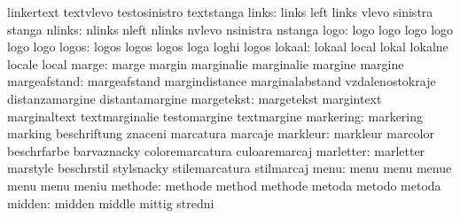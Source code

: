                            linkertext                textvlevo
                           testosinistro             textstanga %
                    links: links                     left
                           links                     vlevo
                           sinistra                  stanga
                   nlinks: nlinks                    nleft
                           nlinks                    nvlevo
                           nsinistra                 nstanga
                     logo: logo                      logo
                           logo                      logo
                           logo                      logo
                    logos: logos                     logos
                           logos                     loga
                           loghi                     logos
                   lokaal: lokaal                    local
                           lokal                     lokalne
                           locale                    local
                    marge: marge                     margin
                           marginalie                marginalie
                           margine                   margine
             margeafstand: margeafstand              margindistance
                           marginalabstand           vzdalenostokraje
                           distanzamargine           distantamargine
               margetekst: margetekst                margintext
                           marginaltext              textmarginalie
                           testomargine              textmargine
                markering: markering                 marking
                           beschriftung              znaceni
                           marcatura                 marcaje
                 markleur: markleur                  marcolor
                           beschrfarbe               barvaznacky
                           coloremarcatura           culoaremarcaj
                marletter: marletter                 marstyle
                           beschrstil                stylsnacky
                           stilemarcatura            stilmarcaj
                     menu: menu                      menu
                           menue                     menu
                           menu                      meniu
                  methode: methode                   method
                           methode                   metoda
                           metodo                    metoda
                   midden: midden                    middle
                           mittig                    stredni
